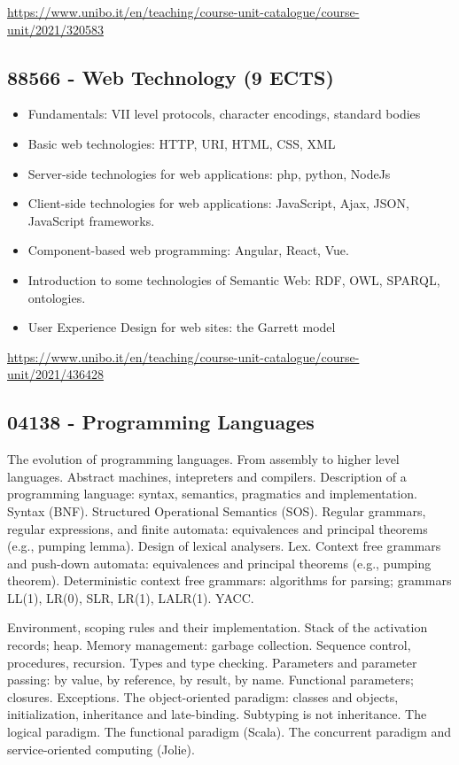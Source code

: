 \documentclass{article}
\begin{document}
\url{https://www.unibo.it/en/teaching/course-unit-catalogue/course-unit/2021/320583}

\subsection{88566 - Web Technology (9 ECTS)}


\begin{itemize}
    \item Fundamentals: VII level protocols, character encodings, standard bodies
\item Basic web technologies: HTTP, URI, HTML, CSS, XML
\item Server-side technologies for web applications: php, python, NodeJs
\item Client-side technologies for web applications: JavaScript, Ajax, JSON, JavaScript frameworks.
\item Component-based web programming: Angular, React, Vue.
\item Introduction to some technologies of Semantic Web: RDF, OWL, SPARQL, ontologies.
\item User Experience Design for web sites: the Garrett model
\end{itemize}

\url{https://www.unibo.it/en/teaching/course-unit-catalogue/course-unit/2021/436428}

\subsection{04138 - Programming Languages}

The evolution of programming languages. From assembly to higher level languages. Abstract machines, intepreters and compilers. Description of a programming language: syntax, semantics, pragmatics and implementation. Syntax (BNF). Structured Operational Semantics (SOS). Regular grammars, regular expressions, and finite automata: equivalences and principal theorems (e.g., pumping lemma). Design of lexical analysers. Lex. Context free grammars and push-down automata: equivalences and principal theorems (e.g., pumping theorem). Deterministic context free grammars: algorithms for parsing; grammars LL(1), LR(0), SLR, LR(1), LALR(1). YACC.

Environment, scoping rules and their implementation. Stack of the activation records; heap. Memory management: garbage collection. Sequence control, procedures, recursion. Types and type checking. Parameters and parameter passing: by value, by reference, by result, by name. Functional parameters; closures. Exceptions. The object-oriented paradigm: classes and objects, initialization, inheritance and late-binding. Subtyping is not inheritance. The logical paradigm. The functional paradigm (Scala). The concurrent paradigm and service-oriented computing (Jolie).
\end{document}
